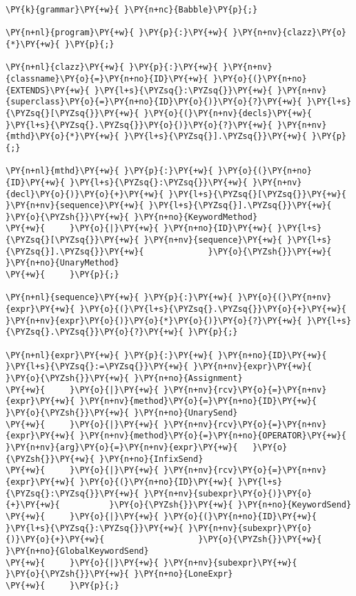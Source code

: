 \begin{Verbatim}[commandchars=\\\{\}]
\PY{k}{grammar}\PY{+w}{ }\PY{n+nc}{Babble}\PY{p}{;}

\PY{n+nl}{program}\PY{+w}{ }\PY{p}{:}\PY{+w}{ }\PY{n+nv}{clazz}\PY{o}{*}\PY{+w}{ }\PY{p}{;}

\PY{n+nl}{clazz}\PY{+w}{ }\PY{p}{:}\PY{+w}{ }\PY{n+nv}{classname}\PY{o}{=}\PY{n+no}{ID}\PY{+w}{ }\PY{o}{(}\PY{n+no}{EXTENDS}\PY{+w}{ }\PY{l+s}{\PYZsq{}:\PYZsq{}}\PY{+w}{ }\PY{n+nv}{superclass}\PY{o}{=}\PY{n+no}{ID}\PY{o}{)}\PY{o}{?}\PY{+w}{ }\PY{l+s}{\PYZsq{}[\PYZsq{}}\PY{+w}{ }\PY{o}{(}\PY{n+nv}{decls}\PY{+w}{ }\PY{l+s}{\PYZsq{}.\PYZsq{}}\PY{o}{)}\PY{o}{?}\PY{+w}{ }\PY{n+nv}{mthd}\PY{o}{*}\PY{+w}{ }\PY{l+s}{\PYZsq{}].\PYZsq{}}\PY{+w}{ }\PY{p}{;}

\PY{n+nl}{mthd}\PY{+w}{ }\PY{p}{:}\PY{+w}{ }\PY{o}{(}\PY{n+no}{ID}\PY{+w}{ }\PY{l+s}{\PYZsq{}:\PYZsq{}}\PY{+w}{ }\PY{n+nv}{decl}\PY{o}{)}\PY{o}{+}\PY{+w}{ }\PY{l+s}{\PYZsq{}[\PYZsq{}}\PY{+w}{ }\PY{n+nv}{sequence}\PY{+w}{ }\PY{l+s}{\PYZsq{}].\PYZsq{}}\PY{+w}{ }\PY{o}{\PYZsh{}}\PY{+w}{ }\PY{n+no}{KeywordMethod}
\PY{+w}{     }\PY{o}{|}\PY{+w}{ }\PY{n+no}{ID}\PY{+w}{ }\PY{l+s}{\PYZsq{}[\PYZsq{}}\PY{+w}{ }\PY{n+nv}{sequence}\PY{+w}{ }\PY{l+s}{\PYZsq{}].\PYZsq{}}\PY{+w}{             }\PY{o}{\PYZsh{}}\PY{+w}{ }\PY{n+no}{UnaryMethod}
\PY{+w}{     }\PY{p}{;}

\PY{n+nl}{sequence}\PY{+w}{ }\PY{p}{:}\PY{+w}{ }\PY{o}{(}\PY{n+nv}{expr}\PY{+w}{ }\PY{o}{(}\PY{l+s}{\PYZsq{}.\PYZsq{}}\PY{o}{+}\PY{+w}{ }\PY{n+nv}{expr}\PY{o}{)}\PY{o}{*}\PY{o}{)}\PY{o}{?}\PY{+w}{ }\PY{l+s}{\PYZsq{}.\PYZsq{}}\PY{o}{?}\PY{+w}{ }\PY{p}{;}

\PY{n+nl}{expr}\PY{+w}{ }\PY{p}{:}\PY{+w}{ }\PY{n+no}{ID}\PY{+w}{ }\PY{l+s}{\PYZsq{}:=\PYZsq{}}\PY{+w}{ }\PY{n+nv}{expr}\PY{+w}{                        }\PY{o}{\PYZsh{}}\PY{+w}{ }\PY{n+no}{Assignment}
\PY{+w}{     }\PY{o}{|}\PY{+w}{ }\PY{n+nv}{rcv}\PY{o}{=}\PY{n+nv}{expr}\PY{+w}{ }\PY{n+nv}{method}\PY{o}{=}\PY{n+no}{ID}\PY{+w}{                  }\PY{o}{\PYZsh{}}\PY{+w}{ }\PY{n+no}{UnarySend}
\PY{+w}{     }\PY{o}{|}\PY{+w}{ }\PY{n+nv}{rcv}\PY{o}{=}\PY{n+nv}{expr}\PY{+w}{ }\PY{n+nv}{method}\PY{o}{=}\PY{n+no}{OPERATOR}\PY{+w}{ }\PY{n+nv}{arg}\PY{o}{=}\PY{n+nv}{expr}\PY{+w}{   }\PY{o}{\PYZsh{}}\PY{+w}{ }\PY{n+no}{InfixSend}
\PY{+w}{     }\PY{o}{|}\PY{+w}{ }\PY{n+nv}{rcv}\PY{o}{=}\PY{n+nv}{expr}\PY{+w}{ }\PY{o}{(}\PY{n+no}{ID}\PY{+w}{ }\PY{l+s}{\PYZsq{}:\PYZsq{}}\PY{+w}{ }\PY{n+nv}{subexpr}\PY{o}{)}\PY{o}{+}\PY{+w}{          }\PY{o}{\PYZsh{}}\PY{+w}{ }\PY{n+no}{KeywordSend}
\PY{+w}{     }\PY{o}{|}\PY{+w}{ }\PY{o}{(}\PY{n+no}{ID}\PY{+w}{ }\PY{l+s}{\PYZsq{}:\PYZsq{}}\PY{+w}{ }\PY{n+nv}{subexpr}\PY{o}{)}\PY{o}{+}\PY{+w}{                   }\PY{o}{\PYZsh{}}\PY{+w}{ }\PY{n+no}{GlobalKeywordSend}
\PY{+w}{     }\PY{o}{|}\PY{+w}{ }\PY{n+nv}{subexpr}\PY{+w}{                             }\PY{o}{\PYZsh{}}\PY{+w}{ }\PY{n+no}{LoneExpr}
\PY{+w}{     }\PY{p}{;}


\end{Verbatim}

